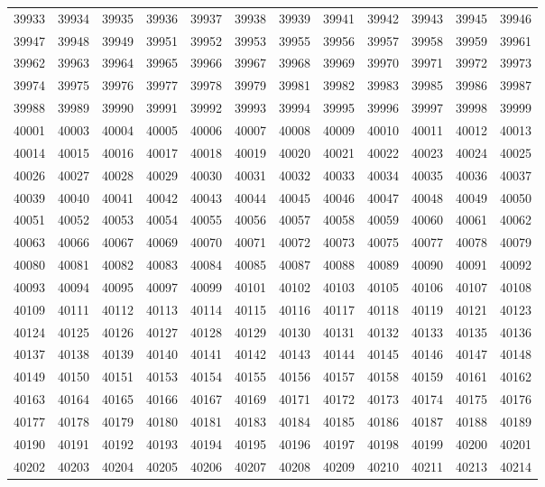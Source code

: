 \begin{center}
\begin{longtable}{llllllllllll}
39933 &39934 &39935 &39936 &39937 &39938 &39939 &39941 &39942 &39943 &39945 &39946 \\
39947 &39948 &39949 &39951 &39952 &39953 &39955 &39956 &39957 &39958 &39959 &39961 \\
39962 &39963 &39964 &39965 &39966 &39967 &39968 &39969 &39970 &39971 &39972 &39973 \\
39974 &39975 &39976 &39977 &39978 &39979 &39981 &39982 &39983 &39985 &39986 &39987 \\
39988 &39989 &39990 &39991 &39992 &39993 &39994 &39995 &39996 &39997 &39998 &39999 \\
40001 &40003 &40004 &40005 &40006 &40007 &40008 &40009 &40010 &40011 &40012 &40013 \\
40014 &40015 &40016 &40017 &40018 &40019 &40020 &40021 &40022 &40023 &40024 &40025 \\
40026 &40027 &40028 &40029 &40030 &40031 &40032 &40033 &40034 &40035 &40036 &40037 \\
40039 &40040 &40041 &40042 &40043 &40044 &40045 &40046 &40047 &40048 &40049 &40050 \\
40051 &40052 &40053 &40054 &40055 &40056 &40057 &40058 &40059 &40060 &40061 &40062 \\
40063 &40066 &40067 &40069 &40070 &40071 &40072 &40073 &40075 &40077 &40078 &40079 \\
40080 &40081 &40082 &40083 &40084 &40085 &40087 &40088 &40089 &40090 &40091 &40092 \\
40093 &40094 &40095 &40097 &40099 &40101 &40102 &40103 &40105 &40106 &40107 &40108 \\
40109 &40111 &40112 &40113 &40114 &40115 &40116 &40117 &40118 &40119 &40121 &40123 \\
40124 &40125 &40126 &40127 &40128 &40129 &40130 &40131 &40132 &40133 &40135 &40136 \\
40137 &40138 &40139 &40140 &40141 &40142 &40143 &40144 &40145 &40146 &40147 &40148 \\
40149 &40150 &40151 &40153 &40154 &40155 &40156 &40157 &40158 &40159 &40161 &40162 \\
40163 &40164 &40165 &40166 &40167 &40169 &40171 &40172 &40173 &40174 &40175 &40176 \\
40177 &40178 &40179 &40180 &40181 &40183 &40184 &40185 &40186 &40187 &40188 &40189 \\
40190 &40191 &40192 &40193 &40194 &40195 &40196 &40197 &40198 &40199 &40200 &40201 \\
40202 &40203 &40204 &40205 &40206 &40207 &40208 &40209 &40210 &40211 &40213 &40214 \\

\end{longtable}
\end{center}
